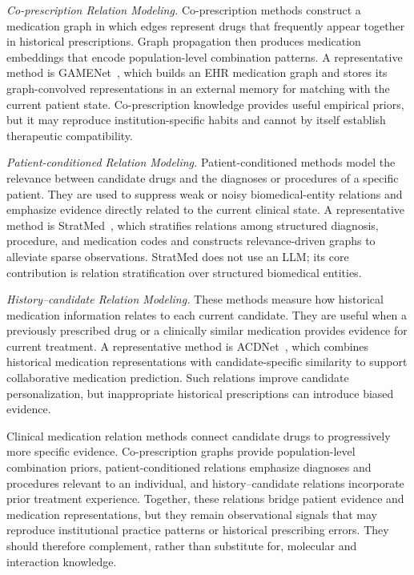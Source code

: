 \documentclass[manuscript,review]{acmart}
\begin{document}
\textit{Co-prescription Relation Modeling.} Co-prescription methods construct a medication graph in which edges represent drugs that frequently appear together in historical prescriptions. Graph propagation then produces medication embeddings that encode population-level combination patterns. A representative method is GAMENet~\cite{shang2019gamenet}, which builds an EHR medication graph and stores its graph-convolved representations in an external memory for matching with the current patient state. Co-prescription knowledge provides useful empirical priors, but it may reproduce institution-specific habits and cannot by itself establish therapeutic compatibility.

\textit{Patient-conditioned Relation Modeling.} Patient-conditioned methods model the relevance between candidate drugs and the diagnoses or procedures of a specific patient. They are used to suppress weak or noisy biomedical-entity relations and emphasize evidence directly related to the current clinical state. A representative method is StratMed~\cite{liStratMedRelevanceStratification2024a}, which stratifies relations among structured diagnosis, procedure, and medication codes and constructs relevance-driven graphs to alleviate sparse observations. StratMed does not use an LLM; its core contribution is relation stratification over structured biomedical entities.

\textit{History--candidate Relation Modeling.} These methods measure how historical medication information relates to each current candidate. They are useful when a previously prescribed drug or a clinically similar medication provides evidence for current treatment. A representative method is ACDNet~\cite{miACDNetAttentionguidedCollaborative2024b}, which combines historical medication representations with candidate-specific similarity to support collaborative medication prediction. Such relations improve candidate personalization, but inappropriate historical prescriptions can introduce biased evidence.

Clinical medication relation methods connect candidate drugs to progressively more specific evidence. Co-prescription graphs provide population-level combination priors, patient-conditioned relations emphasize diagnoses and procedures relevant to an individual, and history--candidate relations incorporate prior treatment experience. Together, these relations bridge patient evidence and medication representations, but they remain observational signals that may reproduce institutional practice patterns or historical prescribing errors. They should therefore complement, rather than substitute for, molecular and interaction knowledge.
\end{document}
